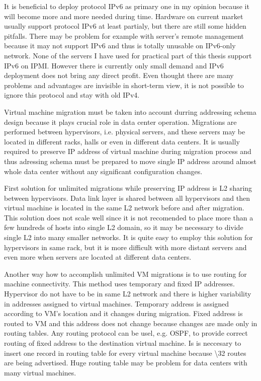 It is beneficial to deploy protocol \Ac{IPv6} as primary one in my opinion because it will become more and more needed during time. Hardware on current market usually support protocol \Ac{IPv6} at least partialy, but there are still some hidden pitfalls. There may be problem for example with server's remote management because it may not support \Ac{IPv6} and thus is totally unusable on \Ac{IPv6}-only network. None of the servers I have used for practical part of this thesis support \Ac{IPv6} on \Ac{IPMI}. 
However there is currently only small demand and \Ac{IPv6} deployment does not bring any direct profit. Even thought there are many problems and advantages are invisible in short-term view, it is not possible to ignore this protocol and stay with old \Ac{IPv4}.

Virtual machine migration must be taken into account durring addressing schema design because it plays crucial role in data center operation. Migrations are performed between hypervisors, i.e. physical servers, and these servers may be located in different racks, halls or even in different data centers. It is usually required to preserve \Ac{IP} address of virtual machine during migration process and thus adressing schema must be prepared to move single \Ac{IP} address around almost whole data center without any significant configuration changes. 

First solution for unlimited migrations while preserving \Ac{IP} address is L2 sharing between hypervisors. Data link layer is shared between all hypervisors and then virtual machine is located in the same L2 network before and after migration. This solution does not scale well since it is not recomended to place more than a few hundreds of hosts into single L2 domain, so it may be necessary to divide single L2 into many smaller networks. It is quite easy to employ this solution for hypervisors in same rack, but it is more difficult with more distant servers and even more when servers are located at different data centers.

Another way how to accomplish unlimited \Ac{VM} migrations is to use routing for machine connectivity. This method uses temporary and fixed \Ac{IP} addresses. Hypervisor do not have to be in same L2 network and there is higher variability in addresses assigned to virtual machines. Temporary address is assigned according to \Ac{VM}'s location and it changes during migration. Fixed address is routed to \Ac{VM} and this address does not change because changes are made only in routing tables. Any routing protocol can be usel, e.g. \Ac{OSPF}, to provide correct routing of fixed address to the destination virtual machine. Is is neccesary to insert one record in routing table for every virtual machine because \textbackslash 32 routes are being advertised. Huge routing table may be problem for data centers with many virtual machines.

